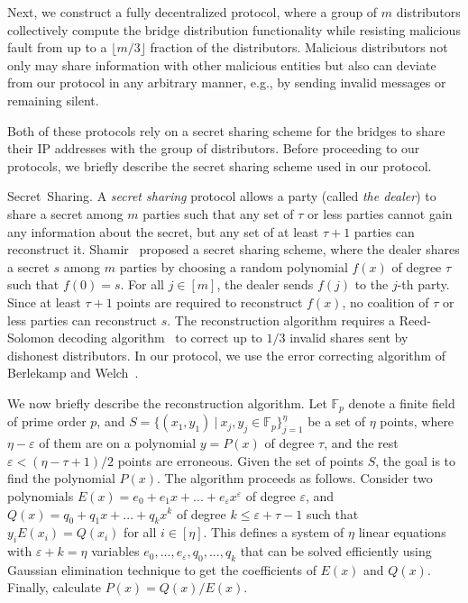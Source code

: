 \documentclass{sig-alternate-05-2015}
\newcommand{\fullpaper}[1]{#1}
\newcommand{\fullpaper}[1]{}
\newcommand{\eg}{e.g.}
\newcommand{\sfsize}{\fontsize{0.8\baselineskip}{0.68\baselineskip}\selectfont}
\newcommand{\sans}[1]{\textsf{\sfsize \mbox{#1}}}
\newcommand{\para}[1]{\vspace{0.55em} \noindent \sans{{\mbox{#1}}}}
\begin{document}
Next, we construct a fully decentralized protocol, where a group of $m$ distributors collectively compute the bridge distribution functionality while resisting malicious fault from up to a $\lfloor m/3 \rfloor$ fraction of the distributors. Malicious distributors not only may share information with other malicious entities but also can deviate from our protocol in any arbitrary manner, \eg, by sending invalid messages or remaining silent.

Both of these protocols rely on a secret sharing scheme for the bridges to share their IP addresses with the group of distributors. Before proceeding to our protocols, we briefly describe the secret sharing scheme used in our protocol.

\para{Secret Sharing.} A \emph{secret sharing} protocol allows a party (called \emph{the dealer}) to share a secret among $m$ parties such that any set of $\tau$ or less parties cannot gain any information about the secret, but any set of at least $\tau+1$ parties can reconstruct it. Shamir~\cite{shamir:how} proposed a secret sharing scheme, where the dealer shares a secret $s$ among $m$ parties by choosing a random polynomial $f(x)$ of degree $\tau$ such that ${f(0)=s}$. For all ${j \in [m]}$, the dealer sends $f(j)$ to the $j$-th party. Since at least ${\tau+1}$ points are required to reconstruct $f(x)$, no coalition of $\tau$ or less parties can reconstruct $s$.
The reconstruction algorithm requires a Reed-Solomon decoding algorithm~\cite{Reed-Solomon1960} to correct up to $1/3$ invalid shares sent by dishonest distributors. In our protocol, we use the error correcting algorithm of Berlekamp and Welch~\cite{Berlekamp:Welch:1986}.

\fullpaper{We now briefly describe the reconstruction algorithm. Let $\mathbb{F}_{p}$ denote a finite field of prime order $p$, and $S=\{(x_{1},y_{1})\:|\:x_{j},y_{j}\in\mathbb{F}_{p}\}_{j=1}^{\eta}$ be a set of $\eta$ points, where $\eta-\varepsilon$ of them are on a polynomial $y=P(x)$ of degree $\tau$, and the rest $\varepsilon<(\eta-\tau+1)/2$ points are erroneous. Given the set of points $S$, the goal is to find the polynomial $P(x)$. The algorithm proceeds as follows. Consider two polynomials $E(x)=e_{0}+e_{1}x+...+e_{\varepsilon}x^{\varepsilon}$ of degree $\varepsilon$, and $Q(x)=q_{0}+q_{1}x+...+q_{k}x^{k}$ of degree $k\leq\varepsilon+\tau-1$ such that $y_{i}E(x_{i})=Q(x_{i})$ for all $i\in[\eta]$. This defines a system of $\eta$ linear equations with $\varepsilon+k=\eta$ variables $e_{0},...,e_{\varepsilon},q_{0},...,q_{k}$ that can be solved efficiently using Gaussian elimination technique to get the coefficients of $E(x)$ and $Q(x)$. Finally, calculate $P(x)=Q(x)/E(x)$.}
\end{document}
